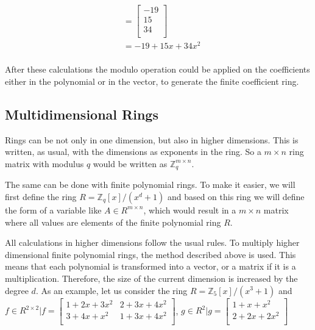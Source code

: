 \begin{align*}
{  }                                                                           \\
                 & = \begin{bmatrix}
                       -19 \\
                       15  \\
                       34  \\
                     \end{bmatrix}                                           \\
                 & = -19+15x+34x^2                                            \\                     
\end{align*}

After these calculations the modulo operation could be applied on the coefficients either in the polynomial or in the vector, to generate the finite coefficient ring.

\subsection*{Multidimensional Rings}

Rings can be not only in one dimension, but also in higher dimensions. This is written, as usual, with the dimensions as exponents in the ring. So a $m \times n$ ring matrix with modulus $q$ would be written as $\mathbb{Z}^{m\times n}_q$.

The same can be done with finite polynomial rings. To make it easier, we will first define the ring $R = \mathbb{Z}_q[x]/(x^d+1)$ and based on this ring we will define the form of a variable like $A \in R^{m\times n}$, which would result in a $m \times n$ matrix where all values are elements of the finite polynomial ring $R$.

All calculations in higher dimensions follow the usual rules. To multiply higher dimensional finite polynomial rings, the method described above is used. This means that each polynomial is transformed into a vector, or a matrix if it is a multiplication. Therefore, the size of the current dimension is increased by the degree $d$. As an example, let us consider the ring $R = \mathbb{Z}_5[x]/(x^3+1)$ and $f \in R^{2\times 2} | f=\begin{bmatrix}
    1+2x+3x^2 & 2+3x+4x^2 \\
    3+4x+x^2  & 1+3x+4x^2 \\
  \end{bmatrix}$, $g \in R^2 | g = \begin{bmatrix}
    1+x+x^2   \\
    2+2x+2x^2 \\
  \end{bmatrix}$


